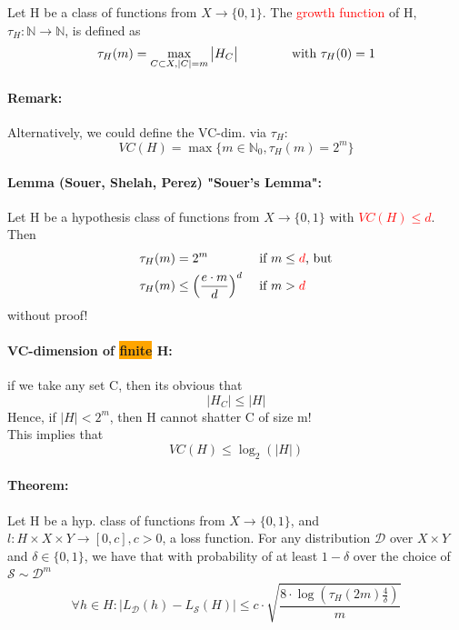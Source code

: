 \documentclass[10pt,a4paper]{article}
\theoremstyle{definition}
\theoremstyle{plain}
\begin{document}
\begin{boxeddef}
	Let H be a class of functions from $X \to \{ 0,1 \}$. The \textcolor{red}{ growth function} of H, $\tau_H: \mathbb{N} \to \mathbb{N}$, is defined as 
	\begin{align*}		
		\tau_H (m) = \max_{C \subset X, |C| = m} \big|H_C\big| \hspace{1.5cm} \text{with } \tau_{H}(0)	= 1
	\end{align*}
\end{boxeddef}

\paragraph{Remark:} Alternatively, we could define the VC-dim. via $\tau_{H}$:
$$
	VC(H) = \max\{m\in\mathbb{N}_0, \tau_{H}(m) = 2^{m}\}
$$

\paragraph{Lemma (Souer, Shelah, Perez) "Souer's Lemma":} Let H be a hypothesis class of functions from $X \to \{ 0,1 \}$ with \textcolor{red}{$VC(H) \leq d$}. Then
\begin{align*}
	\tau_{H}(m) &= 2^{m} &&\text{ if } m \leq \text{\textcolor{red}{$d$}, but}\\
	\tau_{H}(m) &\leq \left(\frac{e\cdot m}{d}\right)^{d} &&\text{ if } m > \text{\textcolor{red}{$d$}}
\end{align*}
without proof!

\paragraph{VC-dimension of \colorbox{orange}{finite} H:} if we take any set C, then its obvious that 
$$ |H_C| \leq |H|$$
Hence, if $|H| < 2^m$, then H cannot shatter C of size m!\\
This implies that 
$$
	VC(H) \leq \log_2(|H|)
$$

\paragraph{Theorem:} Let H be a hyp. class of functions from $X \to \{ 0,1 \}$, and $l: H \times X \times Y \to [0, c], c > 0$, a loss function. For any distribution $\mathcal{D}$ over $X \times Y$ and $\delta \in \{ 0,1 \}$, we have that with probability of at least $1-\delta$ over the choice of $\mathcal{S} \sim \mathcal{D}^{m}$
$$
	\forall h \in H: \big| L_\mathcal{D}(h) - L_\mathcal{S}(H)  \big| \leq c \cdot \sqrt{\frac{8 \cdot \log\left(\tau_{H}(2m) \frac{4}{\delta}\right)}{m}}
$$
\end{document}
